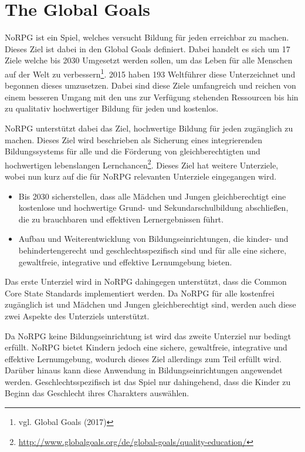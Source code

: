 \section{The Global Goals}
NoRPG ist ein Spiel, welches versucht Bildung für jeden erreichbar zu machen. Dieses Ziel ist dabei in den Global Goals definiert. Dabei handelt es sich um 17 Ziele welche bis 2030 Umgesetzt werden sollen, um das Leben für alle Menschen auf der Welt zu verbessern\footnote{vgl. Global Goals \cite{global} (2017)}. 2015 haben 193 Weltführer diese Unterzeichnet und begonnen dieses umzusetzen. Dabei sind diese Ziele umfangreich und reichen von einem besseren Umgang mit den uns zur Verfügung stehenden Ressourcen bis hin zu qualitativ hochwertiger Bildung für jeden und kostenlos.

NoRPG unterstützt dabei das Ziel, hochwertige Bildung für jeden zugänglich zu machen. Dieses Ziel wird beschrieben als Sicherung eines integrierenden Bildungssystems für alle und die Förderung von gleichberechtigten und hochwertigen lebenslangen Lernchancen\footnote{\url{http://www.globalgoals.org/de/global-goals/quality-education/}}. Dieses Ziel hat weitere Unterziele, wobei nun kurz auf die für NoRPG relevanten Unterziele eingegangen wird.

\begin{itemize}
\item Bis 2030 sicherstellen, dass alle Mädchen und Jungen gleichberechtigt eine kostenlose und hochwertige Grund- und Sekundarschulbildung abschließen, die zu brauchbaren und effektiven Lernergebnissen führt.

\item Aufbau und Weiterentwicklung von Bildungseinrichtungen, die kinder- und behindertengerecht und geschlechtsspezifisch sind und für alle eine sichere, gewaltfreie, integrative und effektive Lernumgebung bieten.
\end{itemize}

Das erste Unterziel wird in NoRPG dahingegen unterstützt, dass die Common Core State Standards implementiert werden. Da NoRPG für alle kostenfrei zugänglich ist und Mädchen und Jungen gleichberechtigt sind, werden auch diese zwei Aspekte des Unterziels unterstützt. 

Da NoRPG keine Bildungseinrichtung ist wird das zweite Unterziel nur bedingt erfüllt. NoRPG bietet Kindern jedoch eine sichere, gewaltfreie, integrative und effektive Lernumgebung, wodurch dieses Ziel allerdings zum Teil erfüllt wird. Darüber hinaus kann diese Anwendung in Bildungseinrichtungen angewendet werden. Geschlechtsspezifisch ist das Spiel nur dahingehend, dass die Kinder zu Beginn das Geschlecht ihres Charakters auswählen.

